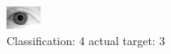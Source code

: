\begin{figure}[h!]
\begin{center}
\includegraphics[width=0.60\columnwidth]{figures/ID2088_class_4_target_3.png}
\end{center}
\caption{ Classification: 4 actual target: 3}
\label{fig:ID2088_class_4_target_3}
\end{figure}
